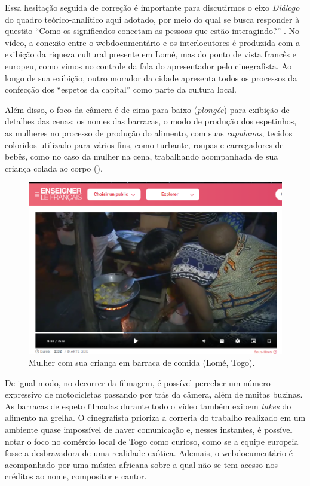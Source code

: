 \documentclass[portuguese]{textolivre}
\begin{document}
Essa hesitação seguida de correção é importante para discutirmos o eixo \emph{Diálogo} do quadro teórico-analítico aqui adotado, por meio do qual se busca responder à questão “Como os significados conectam as pessoas que estão interagindo?” \cite[p. 293]{kalantzis_letramentos_2020}. No vídeo, a conexão entre o webdocumentário e os interlocutores é produzida com a exibição da riqueza cultural presente em Lomé, mas do ponto de vista francês e europeu, como vimos no controle da fala do apresentador pelo cinegrafista. Ao longo de sua exibição, outro morador da cidade apresenta todos os processos da confecção dos “espetos da capital” como parte da cultura local.

Além disso, o foco da câmera é de cima para baixo (\textit{plongée}) para exibição de detalhes das cenas: os nomes das barracas, o modo de produção dos espetinhos, as mulheres no processo de produção do alimento, com suas \textit{capulanas}, tecidos coloridos utilizado para vários fins, como turbante, roupas e carregadores de bebês, como no caso da mulher na cena, trabalhando acompanhada de sua criança colada ao corpo ().

\begin{figure}[h!]
    \centering
    \begin{minipage}{.55\textwidth}
    \includegraphics[width=\linewidth]{Fig7.png}
    \caption{Mulher com sua criança em barraca de comida (Lomé, Togo).}
    \label{fig7}
    \end{minipage}
\end{figure}

De igual modo, no decorrer da filmagem, é possível perceber um número expressivo de motocicletas passando por trás da câmera, além de muitas buzinas. As barracas de espeto filmadas durante todo o vídeo também exibem \textit{takes} do alimento na grelha. O cinegrafista prioriza a correria do trabalho realizado em um ambiente quase impossível de haver comunicação e, nesses instantes, é possível notar o foco no comércio local de Togo como curioso, como se a equipe europeia fosse a desbravadora de uma realidade exótica. Ademais, o webdocumentário é acompanhado por uma música africana sobre a qual não se tem acesso nos créditos ao nome, compositor e cantor.
\end{document}
